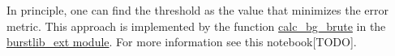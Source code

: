 In principle, one can find the threshold as the value that minimizes 
the error metric. This approach is implemented by the function 
\href{http://fretbursts.readthedocs.org/en/latest/plugins.html#fretbursts.burstlib\_ext.calc\_bg\_brute}{calc\_bg\_brute} 
in the 
\href{http://fretbursts.readthedocs.org/en/latest/plugins.html}{burstlib\_ext module}. 
For more information see this notebook[TODO].

